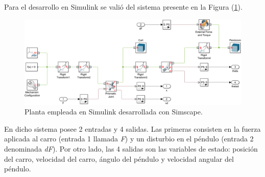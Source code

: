 Para el desarrollo en Simulink se valió del sistema presente en la Figura (\ref{fig:planta_simscape}).

\begin{figure}[H]
	\centering
	\includegraphics[width=0.9\linewidth]{ImagenesDiseño de Planta/planta_simscape}
	\caption{Planta empleada en Simulink desarrollada con Simscape.}	
	\label{fig:planta_simscape}
\end{figure}

En dicho sistema posee 2 entradas y 4 salidas. Las primeras consisten en la fuerza aplicada al carro (entrada 1 llamada \textit{F}) y un disturbio en el péndulo (entrada 2 denominada \textit{dF}). Por otro lado, las 4 salidas son las variables de estado: posición del carro, velocidad del carro, ángulo del péndulo y velocidad angular del péndulo.

%